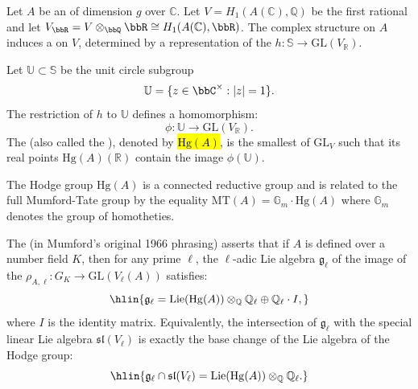 \begin{definition} \label{definition:hodge_group_of_a_complex_torus}
Let $A$ be an  of dimension $g$ over $\mathbb{C}$. Let $V = H_1(A(\mathbb{C}), \mathbb{Q})$ be the first rational  and let $V_\bbR = V \otimes_\bbQ \bbR \cong H_1(A(\mathbb{C}), \bbR)$. The complex structure on $A$ induces a  on $V$, determined by a representation of the  $h: \mathbb{S} \to \mathrm{GL}(V_\mathbb{R})$.

Let $\mathbb{U} \subset \mathbb{S}$ be the unit circle subgroup
$$\mathbb{U} = \{z \in \bbC^\times: |z| = 1\}.$$
The restriction of $h$ to $\mathbb{U}$ defines a homomorphism:
$$\phi: \mathbb{U} \to \mathrm{GL}(V_\mathbb{R}).$$
The  (also called the ), denoted by \hl{$\mathrm{Hg}(A)$}, is the smallest  of $\mathrm{GL}_V$ such that its real points $\mathrm{Hg}(A)(\mathbb{R})$ contain the image $\phi(\mathbb{U})$. 

The Hodge group $\mathrm{Hg}(A)$ is a connected reductive group and is related to the full Mumford-Tate group by the equality $\mathrm{MT}(A) = \mathbb{G}_m \cdot \mathrm{Hg}(A)$ where $\mathbb{G}_m$ denotes the group of homotheties.

The  (in Mumford's original 1966 phrasing) asserts that if $A$ is defined over a number field $K$, then for any prime $\ell$, the $\ell$-adic Lie algebra $\mathfrak{g}_\ell$ of the image of the  $\rho_{A,\ell}: G_K \to \mathrm{GL}(V_\ell(A))$ satisfies:
$$\hlin{\mathfrak{g}_\ell = \operatorname{Lie}(\mathrm{Hg}(A)) \otimes_\mathbb{Q} \mathbb{Q}_\ell \oplus \mathbb{Q}_\ell \cdot I,}$$
where $I$ is the identity matrix. Equivalently, the intersection of $\mathfrak{g}_\ell$ with the special linear Lie algebra $\mathfrak{sl}(V_\ell)$ is exactly the base change of the Lie algebra of the Hodge group:
$$\hlin{\mathfrak{g}_\ell \cap \mathfrak{sl}(V_\ell) = \operatorname{Lie}(\mathrm{Hg}(A)) \otimes_\mathbb{Q} \mathbb{Q}_\ell.}$$
    
\end{definition}
